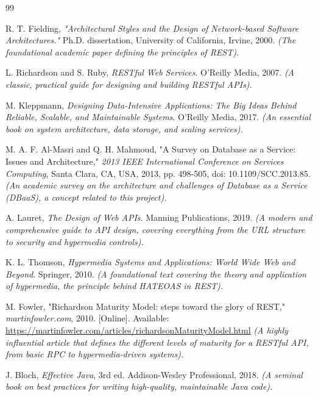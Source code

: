 \documentclass[12pt, a4paper]{report}
\begin{document}
\begin{thebibliography}{99}

R. T. Fielding, \textit{"Architectural Styles and the Design of Network-based Software Architectures."} Ph.D. dissertation, University of California, Irvine, 2000.
\textit{(The foundational academic paper defining the principles of REST).}

L. Richardson and S. Ruby, \textit{RESTful Web Services}. O'Reilly Media, 2007.
\textit{(A classic, practical guide for designing and building RESTful APIs).}

M. Kleppmann, \textit{Designing Data-Intensive Applications: The Big Ideas Behind Reliable, Scalable, and Maintainable Systems}. O'Reilly Media, 2017.
\textit{(An essential book on system architecture, data storage, and scaling services).}

M. A. F. Al-Masri and Q. H. Mahmoud, "A Survey on Database as a Service: Issues and Architecture," \textit{2013 IEEE International Conference on Services Computing}, Santa Clara, CA, USA, 2013, pp. 498-505, doi: 10.1109/SCC.2013.85.
\textit{(An academic survey on the architecture and challenges of Database as a Service (DBaaS), a concept related to this project).}

A. Lauret, \textit{The Design of Web APIs}. Manning Publications, 2019.
\textit{(A modern and comprehensive guide to API design, covering everything from the URL structure to security and hypermedia controls).}

K. L. Thomson, \textit{Hypermedia Systems and Applications: World Wide Web and Beyond}. Springer, 2010.
\textit{(A foundational text covering the theory and application of hypermedia, the principle behind HATEOAS in REST).}

M. Fowler, "Richardson Maturity Model: steps toward the glory of REST," \textit{martinfowler.com}, 2010. [Online]. Available: \url{https://martinfowler.com/articles/richardsonMaturityModel.html}
\textit{(A highly influential article that defines the different levels of maturity for a RESTful API, from basic RPC to hypermedia-driven systems).}

J. Bloch, \textit{Effective Java}, 3rd ed. Addison-Wesley Professional, 2018.
\textit{(A seminal book on best practices for writing high-quality, maintainable Java code).}

\end{thebibliography}
\end{document}
